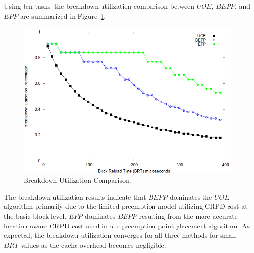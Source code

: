 Using ten tasks, the breakdown utilization comparison between ${UOE}$, ${BEPP}$, and ${EPP}$ are summarized in Figure~\ref{fig:breakdown_utilization}.
\begin{figure}[h!]
\vspace{-10pt}
\begin{center}
\includegraphics[width=\linewidth]{eps/breakdown.png}
\caption{Breakdown Utilization Comparison.}
\label{fig:breakdown_utilization}
\end{center}
\vspace{-10pt}
\end{figure}
The breakdown utilization results indicate that $BEPP$ dominates the $UOE$ algorithm primarily due to the limited preemption model utilizing CRPD cost at the basic block level.  $EPP$ dominates $BEPP$ resulting from the more accurate location aware CRPD cost used in our preemption point placement algorithm.  As expected, the breakdown utilization converges for all three methods for small ${BRT}$ values as the cache-overhead becomes negligible.
